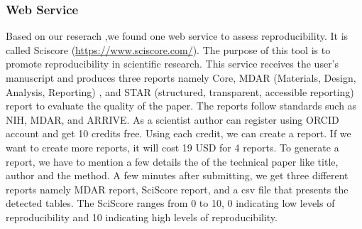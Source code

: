 \documentclass[
10pt, %
a4paper, %
oneside, %
headinclude,footinclude, %
BCOR5mm, %
]{scrartcl}
\begin{document}
\subsubsection{Web Service}
Based on our reserach ,we found one web service to assess reproducibility. 
It is called Sciscore (\url{https://www.sciscore.com/}). 
The purpose of this tool is to promote reproducibility in scientific research. 
This service receives the user’s manuscript and produces three reports namely Core, MDAR (Materials, Design, Analysis, Reporting) \cite{MDAR2021}, and STAR (structured, transparent, accessible reporting) report to evaluate the quality of the paper. 
The reports follow standards such as NIH, MDAR, and ARRIVE. 
As a scientist author can register using ORCID account and get 10 credits free.
Using each credit, we can create a report. 
If we want to create more reports, it will cost 19 USD for 4 reports. 
To generate a report, we have to mention a few details the of the technical paper like title, author and the method. 
A few minutes after submitting, we get three different reports namely MDAR report, SciScore report, and a csv file that presents the detected tables. 
The SciScore ranges from 0 to 10, 0 indicating low levels of reproducibility and 10 indicating high levels of reproducibility. 
\end{document}

